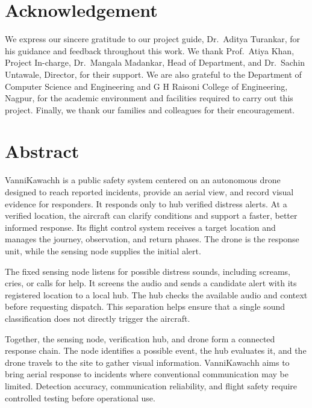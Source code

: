 \documentclass[12pt,a4paper]{report}
\begin{document}
\chapter*{Acknowledgement}
We express our sincere gratitude to our project guide, Dr.~Aditya
Turankar, for his guidance and feedback throughout this work. We
thank Prof.~Atiya Khan, Project In-charge, Dr.~Mangala Madankar, Head
of Department, and Dr.~Sachin Untawale, Director, for their support.
We are also grateful to the Department of Computer Science and
Engineering and G H Raisoni College of Engineering, Nagpur, for the
academic environment and facilities required to carry out this
project. Finally, we thank our families and colleagues for their
encouragement.


\chapter*{Abstract}

VanniKawachh is a public safety system centered on an autonomous drone designed to reach reported incidents, provide an aerial view, and record visual evidence for responders. It responds only to hub verified distress alerts. At a verified location, the aircraft can clarify conditions and support a faster, better informed response. Its flight control system receives a target location and manages the journey, observation, and return phases. The drone is the response unit, while the sensing node supplies the initial alert.

The fixed sensing node listens for possible distress sounds, including screams, cries, or calls for help. It screens the audio and sends a candidate alert with its registered location to a local hub. The hub checks the available audio and context before requesting dispatch. This separation helps ensure that a single sound classification does not directly trigger the aircraft.

Together, the sensing node, verification hub, and drone form a connected response chain. The node identifies a possible event, the hub evaluates it, and the drone travels to the site to gather visual information. VanniKawachh aims to bring aerial response to incidents where conventional communication may be limited. Detection accuracy, communication reliability, and flight safety require controlled testing before operational use.
\end{document}
